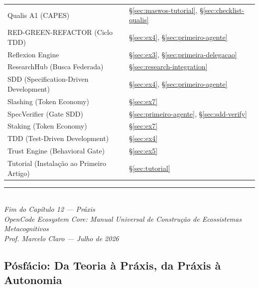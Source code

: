 \begin{table}[H]
\begin{tabular}{@{}ll@{}}
Qualis A1 (CAPES) & \S\ref{sec:maswos-tutorial}, \S\ref{sec:checklist-qualis} \\
RED-GREEN-REFACTOR (Ciclo TDD) & \S\ref{sec:ex4}, \S\ref{sec:primeiro-agente} \\
Reflexion Engine & \S\ref{sec:ex3}, \S\ref{sec:primeira-delegacao} \\
ResearchHub (Busca Federada) & \S\ref{sec:research-integration} \\
SDD (Specification-Driven Development) & \S\ref{sec:ex4}, \S\ref{sec:primeiro-agente} \\
Slashing (Token Economy) & \S\ref{sec:ex7} \\
SpecVerifier (Gate SDD) & \S\ref{sec:primeiro-agente}, \S\ref{sec:sdd-verify} \\
Staking (Token Economy) & \S\ref{sec:ex7} \\
TDD (Test-Driven Development) & \S\ref{sec:ex4} \\
Trust Engine (Behavioral Gate) & \S\ref{sec:ex5} \\
Tutorial (Instalação ao Primeiro Artigo) & \S\ref{sec:tutorial} \\
\bottomrule
\end{tabular}
\end{table}


\vspace{1cm}
\begin{center}
\rule{0.5\textwidth}{0.5pt}\\[0.5cm]
\textit{Fim do Capítulo 12 — Práxis}\\[0.3cm]
\textit{OpenCode Ecosystem Core: Manual Universal de Construção de Ecossistemas Metacognitivos}\\[0.3cm]
\textit{Prof. Marcelo Claro — Julho de 2026}
\end{center}


\subsection*{Pósfácio: Da Teoria à Práxis, da Práxis à Autonomia}

